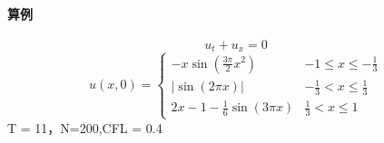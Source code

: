 \documentclass{book}
\begin{document}
\paragraph{算例}

\begin{example}
    \cite{2021Youngsoo}
    \begin{equation}
        u_t + u_x = 0
    \end{equation}
    \begin{equation}
        u(x, 0)=\begin{cases}
            -x \sin \left(\frac{3 \pi}{2} x^{2}\right) & -1\leqslant x \leqslant -\frac{1}{3}  \\
            |\sin (2 \pi x)|                           & -\frac{1}{3}< x \leqslant \frac{1}{3} \\
            2 x-1-\frac{1}{6} \sin (3 \pi x)           & \frac{1}{3} < x \leqslant 1
        \end{cases}
    \end{equation}
    T = 11，N=200,CFL = 0.4
\end{example}
\end{document}

